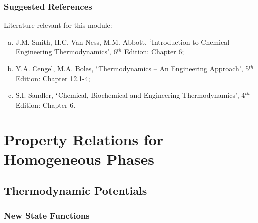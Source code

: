\documentclass[10pt,compress]{beamer}
\begin{document}
\begin{frame}
 \frametitle{Suggested References}
  Literature relevant for this module:
  \begin{enumerate}[(a)]
   \item\label{SVN_Book} J.M. Smith, H.C. Van Ness, M.M. Abbott, $\lq$Introduction to Chemical Engineering Thermodynamics', 6$^{th}$ Edition: Chapter 6;
   \item Y.A. Cengel, M.A. Boles, $\lq$Thermodynamics -- An Engineering Approach', 5$^{th}$ Edition: Chapter 12.1-4; 
   \item S.I. Sandler, $\lq$Chemical, Biochemical and Engineering Thermodynamics', 4$^{th}$ Edition: Chapter 6.
  \end{enumerate}
\end{frame}


\section{Property Relations for Homogeneous Phases}

\subsection{Thermodynamic Potentials} 


\begin{frame}
  \frametitle{New State Functions}

\end{frame}
\normalsize
\end{document}

